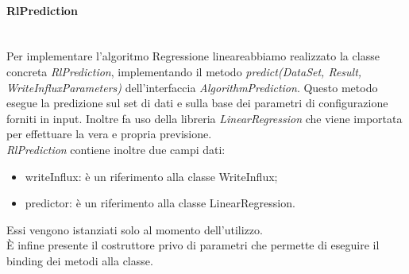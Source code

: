 \paragraph*{RlPrediction} \mbox{}\\ [1mm]
Per implementare l'algoritmo Regressione lineare\glosp abbiamo realizzato la classe concreta \textit{RlPrediction}, implementando il metodo \textit{predict(DataSet, Result, WriteInfluxParameters)} dell'interfaccia \textit{AlgorithmPrediction}.
Questo metodo esegue la predizione sul set di dati e sulla base dei parametri di configurazione forniti in input. Inoltre fa uso della libreria \textit{LinearRegression}  che viene importata per effettuare la vera e propria previsione. \\
\textit{RlPrediction} contiene inoltre due campi dati:
\begin{itemize}
	\item writeInflux: è un riferimento alla classe WriteInflux;
	\item predictor: è un riferimento alla classe LinearRegression.
\end{itemize}
Essi vengono istanziati solo al momento dell'utilizzo. \\
È infine presente il costruttore privo di parametri che permette di eseguire il binding dei metodi alla classe.
